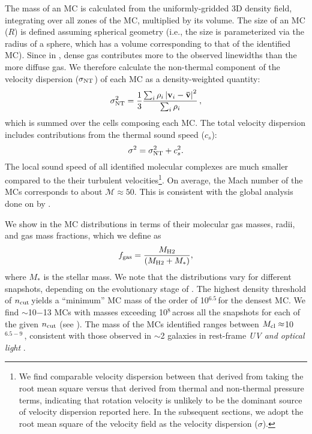 \IfFileExists{emulateapjlegacy.cls}{\documentclass[iop]{emulateapjlegacy}}{\documentclass[iop]{emulateapj}}
\newcommand{\AP}[1]{({\bf \color{apcolor} AP: #1})}
\begin{document}
The mass of an MC is calculated from the uniformly-gridded 3D density field,
integrating over all zones of the MC, multiplied by its volume.
The size of an MC ($R$) is defined assuming spherical geometry (i.e.,
the size is parameterized via the radius of a sphere, which has a volume corresponding to that of the identified MC).
Since in \obs, dense gas contributes more to the observed linewidths than the more diffuse gas. We therefore calculate
the non-thermal component of the velocity dispersion ($\sigma_{\rm NT}$) of each MC as a density-weighted quantity:
\begin{equation}
\sigma_{\rm NT}^2 = \frac{1}{{3}}\frac{\sum_{i} \rho_i \left|\mathbf{v}_i - \mathbf{\bar v}\right|^2}{\sum_i \rho_i}\,,
\end{equation}
which is summed over the cells composing each MC.
The total velocity dispersion includes contributions from the thermal sound speed ($c_s$):
\begin{equation}
\sigma^2 = \sigma_{\rm NT}^2 + c_s^2.
\end{equation}
The local sound speed of all identified molecular complexes are much smaller compared to the their
turbulent velocities\footnote{We find comparable velocity dispersion between that derived from
taking the root mean square versus that derived from thermal and non-thermal pressure terms, indicating that
rotation velocity is unlikely to be the dominant source of velocity dispersion reported here.
In the subsequent sections, we adopt the root mean square of the velocity field
as the velocity dispersion ($\sigma$).}.
On average, the Mach number of the MCs corresponds to about $\mathcal{M}\approx50$.
This is consistent with the global analysis done on \flower by \citet{Vallini18a}.


We show in  the MC distributions in terms of their
molecular gas masses, radii, and gas mass fractions, which we define as
\begin{equation}
f_{\rm gas} = \frac{M_{\rm H2}} {\left(M_{\rm H2} + M_*\right)},
\end{equation}
where $M_*$ is the stellar mass.
We note that the distributions vary for different snapshots, depending on the evolutionary stage of \flower.
The highest density threshold of $n_{\rm cut}$\,\cc yields a ``minimum'' MC mass of
the order of 10$^{6.5}$\,\Msun for the densest MC.
We find $\sim$10$-$13 MCs with masses exceeding 10$^8$\,\Msun across all the
snapshots for each of the given $n_{\rm cut}$ (see ).
The mass of the MCs identified ranges between $M_{\rm cl}\approx$10$^{6.5-9}$\,\Msun, 
consistent with those observed in \z$\sim$2 galaxies in
rest-frame {\it UV and optical light} \citep{Elmegreen07a, Elmegreen09a}.
\end{document}
